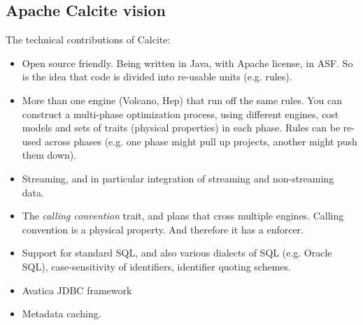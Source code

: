 \subsection{Apache Calcite vision}
\label{subsec:vision}

The technical contributions of Calcite:

\begin{itemize}
	\item Open source friendly. Being written in Java, with Apache license, in ASF. So is the idea that code is divided into re-usable units (e.g. rules).
	\item More than one engine (Volcano, Hep) that run off the same rules. You can construct a multi-phase optimization process, using different engines, cost models and sets of traits (physical properties) in each phase. Rules can be re-used across phases (e.g. one phase might pull up projects, another might push them down).
	\item Streaming, and in particular integration of streaming and non-streaming data.
	\item The \textit{calling convention} trait, and plans that cross multiple engines. Calling convention is a physical property. And therefore it has a enforcer.
	\item Support for standard SQL, and also various dialects of SQL (e.g. Oracle SQL), case-sensitivity of identifiers, identifier quoting schemes.
	\item Avatica JDBC framework
	\item Metadata caching.
\end{itemize}

